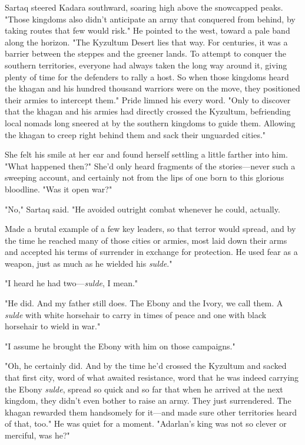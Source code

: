 Sartaq steered Kadara southward, soaring high above the snowcapped peaks. "Those kingdoms also didn't anticipate an army that conquered from behind, by taking routes that few would risk." He pointed to the west, toward a pale band along the horizon. "The Kyzultum Desert lies that way. For centuries, it was a barrier between the steppes and the greener lands. To attempt to conquer the southern territories, everyone had always taken the long way around it, giving plenty of time for the defenders to rally a host. So when those kingdoms heard the khagan and his hundred thousand warriors were on the move, they positioned their armies to intercept them." Pride limned his every word. "Only to discover that the khagan and his armies had directly crossed the Kyzultum, befriending local nomads long sneered at by the southern kingdoms to guide them. Allowing the khagan to creep right behind them and sack their unguarded cities."

She felt his smile at her ear and found herself settling a little farther into him. "What happened then?" She'd only heard fragments of the stories---never such a sweeping account, and certainly not from the lips of one born to this glorious bloodline. "Was it open war?"

"No," Sartaq said. "He avoided outright combat whenever he could, actually.

Made a brutal example of a few key leaders, so that terror would spread, and by the time he reached many of those cities or armies, most laid down their arms and accepted his terms of surrender in exchange for protection. He used fear as a weapon, just as much as he wielded his
\emph{sulde}."

"I heard he had two---\emph{sulde}, I mean."

"He did. And my father still does. The Ebony and the Ivory, we call them. A \emph{sulde} with white horsehair to carry in times of peace and one with black horsehair to wield in war."

"I assume he brought the Ebony with him on those campaigns."

"Oh, he certainly did. And by the time he'd crossed the Kyzultum and sacked that first city, word of what awaited resistance, word that he was indeed carrying the Ebony \emph{sulde}, spread so quick and so far that when he arrived at the next kingdom, they didn't even bother to raise an army. They just surrendered. The khagan rewarded them handsomely for it---and made sure other territories heard of that, too." He was quiet for a moment. "Adarlan's king was not so clever or merciful, was he?"


